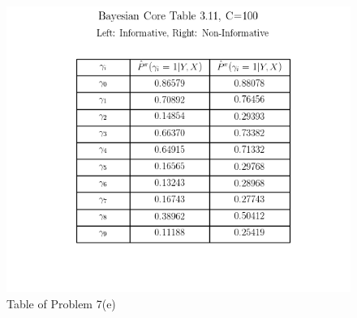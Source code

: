 \documentclass{article}
\begin{document}
\begin{figure}[ht]
\centering
\includegraphics[scale=0.6]{Table3_11.png}
\caption{Table of Problem 7(e)}
\end{figure}


%
%
\end{document}
